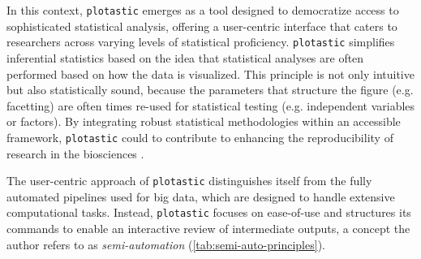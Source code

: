 In this context, \texttt{plotastic} emerges as a tool designed to democratize
access to sophisticated statistical analysis, offering a user-centric interface
that caters to researchers across varying levels of statistical proficiency.
\texttt{plotastic} simplifies inferential statistics based on the idea that
statistical analyses are often performed based on how the data is visualized.
This principle is not only intuitive but also statistically sound,
because the parameters that structure the figure (e.g. facetting) are often
times re-used for statistical testing (e.g. independent variables or factors).
By integrating robust statistical methodologies within an accessible framework,
\texttt{plotastic} could to contribute to enhancing the reproducibility of
research in the biosciences \cite{gomez-cabreroDataIntegrationEra2014}.

\pagebreak

The user-centric approach of \texttt{plotastic} distinguishes itself from the
fully automated pipelines used for big data, which are designed to handle
extensive computational tasks. Instead, \texttt{plotastic} focuses on
ease-of-use and structures its commands to enable an interactive review of
intermediate outputs, a concept the author refers to as \textit{semi-automation}
(\autoref{tab:semi-auto-principles}).


